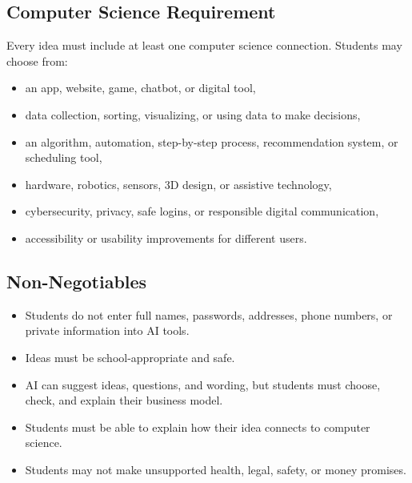 \documentclass[11pt]{article}
\begin{document}
\subsection{Computer Science Requirement}
Every idea must include at least one computer science connection. Students may choose from:
\begin{itemize}
  \item an app, website, game, chatbot, or digital tool,
  \item data collection, sorting, visualizing, or using data to make decisions,
  \item an algorithm, automation, step-by-step process, recommendation system, or scheduling tool,
  \item hardware, robotics, sensors, 3D design, or assistive technology,
  \item cybersecurity, privacy, safe logins, or responsible digital communication,
  \item accessibility or usability improvements for different users.
\end{itemize}

\subsection{Non-Negotiables}
\begin{itemize}
  \item Students do not enter full names, passwords, addresses, phone numbers, or private information into AI tools.
  \item Ideas must be school-appropriate and safe.
  \item AI can suggest ideas, questions, and wording, but students must choose, check, and explain their business model.
  \item Students must be able to explain how their idea connects to computer science.
  \item Students may not make unsupported health, legal, safety, or money promises.
\end{itemize}
\end{document}
